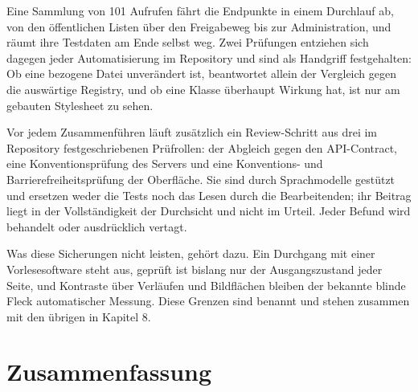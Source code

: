 Eine Sammlung von 101 Aufrufen fährt die Endpunkte in einem Durchlauf ab, von den öffentlichen Listen über den Freigabeweg bis zur Administration, und räumt ihre Testdaten am Ende selbst weg. Zwei Prüfungen entziehen sich dagegen jeder Automatisierung im Repository und sind als Handgriff festgehalten: Ob eine bezogene Datei unverändert ist, beantwortet allein der Vergleich gegen die auswärtige Registry, und ob eine Klasse überhaupt Wirkung hat, ist nur am gebauten Stylesheet zu sehen.

Vor jedem Zusammenführen läuft zusätzlich ein Review-Schritt aus drei im Repository festgeschriebenen Prüfrollen: der Abgleich gegen den API-Contract, eine Konventionsprüfung des Servers und eine Konventions- und Barrierefreiheitsprüfung der Oberfläche. Sie sind durch Sprachmodelle gestützt und ersetzen weder die Tests noch das Lesen durch die Bearbeitenden; ihr Beitrag liegt in der Vollständigkeit der Durchsicht und nicht im Urteil. Jeder Befund wird behandelt oder ausdrücklich vertagt.

Was diese Sicherungen nicht leisten, gehört dazu. Ein Durchgang mit einer Vorlesesoftware steht aus, geprüft ist bislang nur der Ausgangszustand jeder Seite, und Kontraste über Verläufen und Bildflächen bleiben der bekannte blinde Fleck automatischer Messung. Diese Grenzen sind benannt und stehen zusammen mit den übrigen in Kapitel 8.

\section{Zusammenfassung}
\label{sec:zusammenfassung-realisierung}

